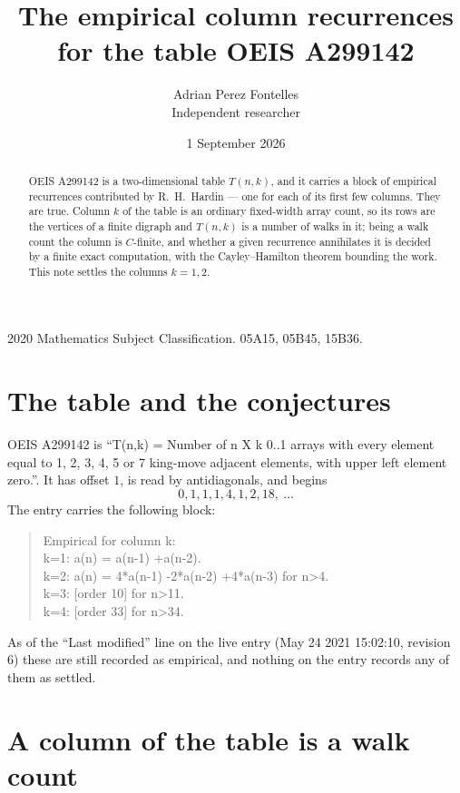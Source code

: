 \documentclass[11pt,a4paper]{article}
\title{The empirical column recurrences for the table OEIS A299142}
\author{Adrian Perez Fontelles\\ \small Independent researcher}
\date{1 September 2026}
\theoremstyle{plain}
\theoremstyle{definition}
\begin{document}
\maketitle

\begin{abstract}
OEIS A299142 is a two-dimensional table $T(n,k)$, and it carries a block of empirical
recurrences contributed by R.~H.~Hardin --- one for each of its first few columns. They are
true. Column $k$ of the table is an ordinary fixed-width array count, so its rows are the
vertices of a finite digraph and $T(n,k)$ is a number of walks in it; being a walk count the
column is $C$-finite, and whether a given recurrence annihilates it is decided by a finite
exact computation, with the Cayley--Hamilton theorem bounding the work. This note settles the columns $k=1, 2$.
\end{abstract}

\noindent\small 2020 Mathematics Subject Classification. 05A15, 05B45, 15B36.\normalsize

\section{The table and the conjectures}

OEIS A299142 is ``T(n,k) = Number of n X k 0..1 arrays with every element equal to 1, 2, 3, 4, 5 or 7 king-move adjacent elements, with upper left element zero.''. It has offset $1$, is
read by antidiagonals, and begins
\[
0, 1, 1, 1, 4, 1, 2, 18,\ \dots
\]
The entry carries the following block:
\begin{quote}\small
Empirical for column k:\\
k=1: a(n) = a(n-1) +a(n-2).\\
k=2: a(n) = 4*a(n-1) -2*a(n-2) +4*a(n-3) for n>4.\\
k=3: [order 10] for n>11.\\
k=4: [order 33] for n>34.\\
\end{quote}
As of the ``Last modified'' line on the live entry (May 24 2021 15:02:10, revision 6) these are still
recorded as empirical, and nothing on the entry records any of them as settled.

\section{A column of the table is a walk count}
\end{document}
